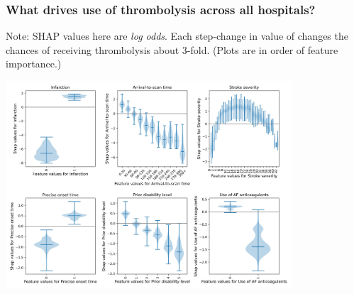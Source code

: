 \documentclass[xcolor={usenames,dvipsnames}]{beamer}
\begin{document}

\begin{frame}
\frametitle{What drives use of thrombolysis across all hospitals?}

\footnotesize{Note: SHAP values here are \emph{log odds}. Each step-change in value of  changes the chances of receiving thrombolysis about 3-fold. (Plots are in order of feature importance.)}

\begin{center}
\includegraphics[width=0.80\textwidth]{./images/xgb_thrombolysis_shap_violin.jpg}
\end{center}
\end{frame}

\end{document}
